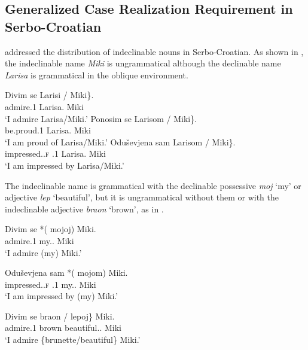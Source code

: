 \documentclass[output=paper,
]{langscibook}
\begin{document}
\subsection{Generalized Case Realization Requirement in Serbo-Croatian}


\citet{Horvath2014} addressed the distribution of indeclinable nouns in Serbo-Croatian.
As shown in , 
the indeclinable name \textit{Miki} is ungrammatical although the declinable name \textit{Larisa} is grammatical in the oblique environment.

\begin{exe}
\ex\label{SCind} 
\begin{xlist}
\ex
\gll	Divim se \minsp{\{} Larisi / \minsp{*} Miki\}.\\
		admire.1{\SG} {\REFL} {} Larisa.{\DAT} {} {} Miki\\
\trans	`I admire Larisa/Miki.'
\ex
\gll	Ponosim se \minsp{\{} Larisom / \minsp{*} Miki\}.\\
		be.proud.1{\SG} {\REFL} {} Larisa.{\INS} {} {} Miki\\
\trans	`I am proud of Larisa/Miki.'
\ex
\gll	Oduševjena sam \minsp{\{} Larisom / \minsp{*} Miki\}.\\
		impressed.{\PTCP}.\textsc{f} {\AUX}.1{\SG} {} Larisa.{\INS} {} {} Miki\\\samepage
\trans	`I am impressed by Larisa/Miki.'
\hfill\citep[121]{Horvath2014}
\end{xlist}
\end{exe}

\noindent
The indeclinable name is grammatical with the declinable possessive \textit{moj} `my' or adjective \textit{lep} `beautiful', but it is ungrammatical without them or with the indeclinable adjective \textit{braon} `brown', as in .


\begin{exe}
\ex\label{SCmy}  
\begin{xlist}
\ex
\gll	Divim se *(\hspace{-2pt} mojoj) Miki.\\
		admire.1{\SG} {\REFL} {} my.{\DAT.\SG} Miki\\
\trans	`I admire (my) Miki.'

\ex
\gll	Oduševjena sam *(\hspace{-2pt} mojom) Miki.\\
		impressed.{\SG}.\textsc{f} {\AUX}.1{\SG} {} my.{\INS}.{\SG} Miki\\
\trans	`I am impressed by (my) Miki.'

\ex
\gll	Divim se \minsp{\{*} braon / lepoj\} Miki.\\
		admire.1{\SG} {\REFL} {} brown {} beautiful.{\DAT}.{\SG} Miki\\
\trans	`I admire \{brunette/beautiful\} Miki.'
\hfill\citep[121]{Horvath2014}
\end{xlist}
\end{exe}
\end{document}
